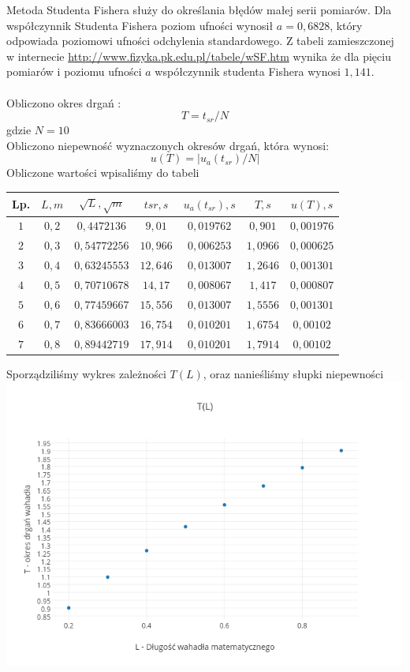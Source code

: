 \documentclass{article}
\begin{document}
Metoda Studenta Fishera służy do określania błędów małej serii pomiarów.  
Dla współczynnik Studenta Fishera poziom ufności wynosił $a=0,6828$, który odpowiada poziomowi ufności odchylenia standardowego. Z tabeli zamieszczonej w internecie \url{http://www.fizyka.pk.edu.pl/tabele/wSF.htm} wynika że dla pięciu  pomiarów i  poziomu ufności $a$ współczynnik studenta Fishera wynosi $1,141$.\\\\
Obliczono okres drgań :
$$T=t_{sr}/N$$
gdzie $N = 10$\\
Obliczono niepewność wyznaczonych okresów drgań, która wynosi:
$$u(T)=\left|u_a(t_{sr})/N\right|$$
Obliczone wartości wpisaliśmy do tabeli
\begin{center}
    \begin{tabular}{|c|c|c|c|c|c|c|}
    \hline
    Lp. & $L, m$ & $\sqrt{L}, \sqrt{m}$ & $tsr, s$ & $u_a(t_{sr}) , s$ & $T, s$ & $u(T), s$ \\ \hline
    $1$ & $0,2$ & $0,4472136$ & $9,01$ & $0,019762$ & $0,901$ & $0,001976$ \\ \hline
    $2$ & $0,3$ & $0,54772256$ & $10,966$ & $0,006253$ & $1,0966$ & $0,000625$ \\ \hline
    $3$ & $0,4$ & $0,63245553$ & $12,646$ & $0,013007$ & $1,2646$ & $0,001301$ \\ \hline
    $4$ & $0,5$ & $0,70710678$ & $14,17$ & $0,008067$ & $1,417$ & $0,000807$ \\ \hline
    $5$ & $0,6$ & $0,77459667$ & $15,556$ & $0,013007$ & $1,5556$ & $0,001301$ \\ \hline
    $6$ & $0,7$ & $0,83666003$ & $16,754$ & $0,010201$ & $1,6754$ & $0,00102$ \\ \hline
    $7$ & $0,8$ & $0,89442719$ & $17,914$ & $0,010201$ & $1,7914$ & $0,00102$ \\ \hline
    \end{tabular}
\end{center}
Sporządziliśmy wykres zależności $T(L)$, oraz nanieśliśmy słupki niepewności\\
\includegraphics[height=0.5\textheight]{Plot2.png}\\
\end{document}
